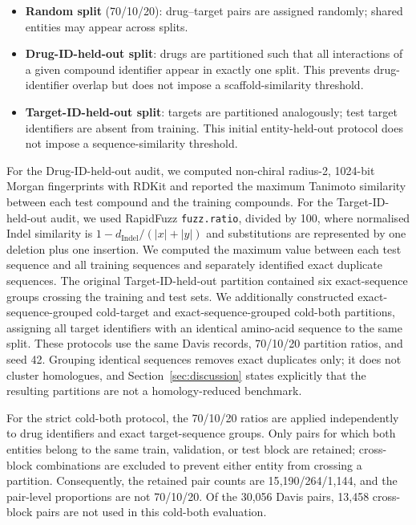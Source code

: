 \documentclass[fleqn,10pt]{wlscirep}
\begin{document}
\begin{itemize}[leftmargin=*]
\item \textbf{Random split} (70/10/20): drug--target pairs are assigned randomly;
  shared entities may appear across splits.
\item \textbf{Drug-ID-held-out split}: drugs are partitioned such that all interactions
  of a given compound identifier appear in exactly one split.  This prevents
  drug-identifier overlap but does not impose a scaffold-similarity threshold.
\item \textbf{Target-ID-held-out split}: targets are partitioned analogously; test
  target identifiers are absent from training.  This initial entity-held-out
  protocol does not impose a sequence-similarity threshold.
\end{itemize}

For the Drug-ID-held-out audit, we computed non-chiral radius-2, 1024-bit Morgan
fingerprints with RDKit and
reported the maximum Tanimoto similarity between each test compound and the
training compounds. For the Target-ID-held-out audit, we used RapidFuzz
\texttt{fuzz.ratio}, divided by 100, where normalised Indel similarity is
$1-d_\mathrm{Indel}/(|x|+|y|)$ and substitutions are represented by one
deletion plus one insertion. We computed the maximum value between each test
sequence and all training sequences and separately identified exact duplicate
sequences. The original
Target-ID-held-out partition contained six exact-sequence groups crossing the
training and test sets. We additionally constructed exact-sequence-grouped cold-target
and exact-sequence-grouped cold-both partitions, assigning all target identifiers with an identical
amino-acid sequence to the same split.
\begingroup\color{red}
These protocols use the same Davis records, 70/10/20 partition ratios, and
seed 42.  Grouping identical sequences removes exact duplicates only; it does
not cluster homologues, and Section~\ref{sec:discussion} states explicitly that
the resulting partitions are not a homology-reduced benchmark.
\endgroup

For the strict cold-both protocol, the 70/10/20 ratios are applied independently
to drug identifiers and exact target-sequence groups. Only pairs for which both
entities belong to the same train, validation, or test block are retained;
cross-block combinations are excluded to prevent either entity from crossing a
partition. Consequently, the retained pair counts are 15{,}190/264/1{,}144,
and the pair-level proportions are not 70/10/20. Of the 30{,}056 Davis pairs,
13{,}458 cross-block pairs are not used in this cold-both evaluation.
\end{document}
